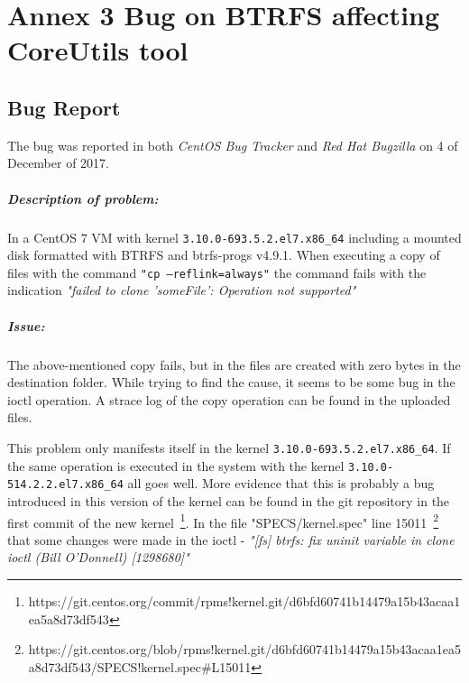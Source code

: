 \chapter{Annex 3 Bug on BTRFS affecting CoreUtils tool}
\label{ann:bug}

%

\section{Bug Report}
\label{sec:bug_report}

The bug was reported in both \textit{CentOS Bug Tracker} and \textit{Red Hat Bugzilla} on 4 of December of 2017.

\paragraph{Description of problem:}

In a CentOS 7 VM with kernel \texttt{3.10.0-693.5.2.el7.x86\_64} including a mounted disk formatted with BTRFS and btrfs-progs v4.9.1.
When executing a copy of files with the command \texttt{"cp --reflink=always"} the command fails with the indication \textit{"failed to clone 'someFile': Operation not supported"}

\paragraph{Issue:}

The above-mentioned copy fails, but in the files are created with zero bytes in the destination folder.
While trying to find the cause, it seems to be some bug in the ioctl operation. A strace log of the copy operation can be found in the uploaded files.

This problem only manifests itself in the kernel \texttt{3.10.0-693.5.2.el7.x86\_64}. If the same operation is executed in the system with the kernel \texttt{3.10.0-514.2.2.el7.x86\_64} all goes well.
More evidence that this is probably a bug introduced in this version of the kernel can be found in the git repository in the first commit of the new kernel~\footnote{https://git.centos.org/commit/rpms!kernel.git/d6bfd60741b14479a15b43acaa1ea5a8d73df543}.
In the file "SPECS/kernel.spec" line 15011~\footnote{https://git.centos.org/blob/rpms!kernel.git/d6bfd60741b14479a15b43acaa1ea5a8d73df543/SPECS!kernel.spec\#L15011} that some changes were made in the ioctl - \textit{"[fs] btrfs: fix uninit variable in clone ioctl (Bill O'Donnell) [1298680]"}


